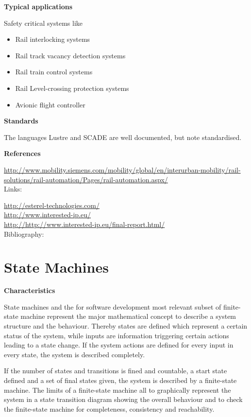 \documentclass{./template/openetcs_report}
\begin{document}
	\textbf{Typical applications}

Safety critical systems like
\vspace{-10pt}
\begin{itemize}[topsep=2pt, partopsep=2pt,itemsep=2pt,parsep=2pt]
  \item Rail interlocking systems
  \item Rail track vacancy detection systems
  \item Rail train control systems
  \item Rail Level-crossing protection systems
  \item Avionic flight controller
\end{itemize}


	\textbf{Standards}

The languages Lustre and SCADE are well documented, but note standardised.

	\textbf{References}
	
\url{http://www.mobility.siemens.com/mobility/global/en/interurban-mobility/rail-solutions/rail-automation/Pages/rail-automation.aspx/} \\[4pt]	

Links:

\url{http://esterel-technologies.com/} \\[4pt]
\url{http://www.interested-ip.eu/}\\[4pt]
\url{http://http://www.interested-ip.eu/final-report.html/} \\[4pt]


Bibliography:

\section{State Machines}


	\textbf{Characteristics}

State machines and the for software development most relevant subset of finite-state machine represent the major mathematical concept to describe a system structure and the behaviour. Thereby states are defined which represent a certain status of the system, while inputs are information triggering certain actions leading to a state change. If the system actions are defined for every input in every state, the system is described completely.

If the number of states and transitions is fined and countable, a start state defined and a set of final states given, the system is described by a finite-state machine. The limits of a finite-state machine all to graphically represent the system in a state transition diagram showing the overall behaviour and to check the finite-state machine for completeness, consistency and reachability.
\end{document}
